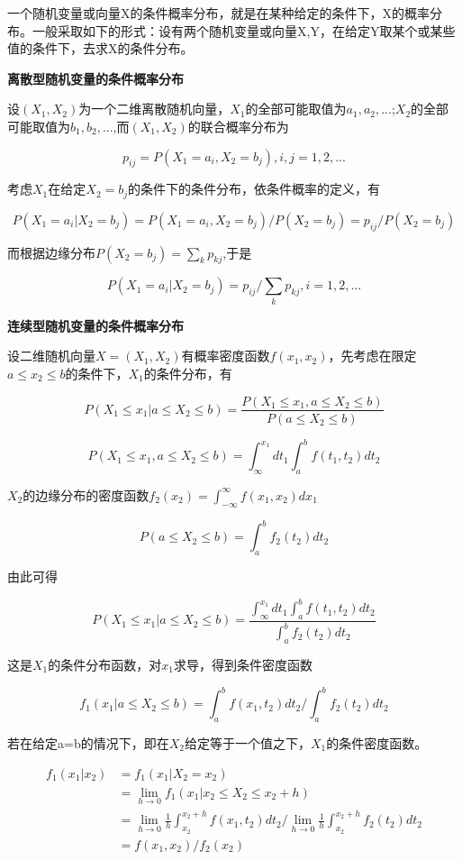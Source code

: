 \documentclass{ctexart}
\begin{document}
	一个随机变量或向量X的条件概率分布，就是在某种给定的条件下，X的概率分布。一般采取如下的形式：设有两个随机变量或向量X,Y，在给定Y取某个或某些值的条件下，去求X的条件分布。
	
	\mbox{}
	
	\textbf{离散型随机变量的条件概率分布}
	
	设\((X_1,X_2)\)为一个二维离散随机向量，\(X_1\)的全部可能取值为\(a_1,a_2,...\);\(X_2\)的全部可能取值为\(b_1,b_2,...\),而\((X_1,X_2)\)的联合概率分布为
	
	\[p_{ij}=P(X_1=a_i,X_2=b_j), i,j=1,2,...\]
	
	考虑\(X_1\)在给定\(X_2=b_j\)的条件下的条件分布，依条件概率的定义，有
	
	\[P(X_1=a_i|X_2=b_j)=P(X_1=a_i, X_2=b_j)/P(X_2=b_j)=p_{ij}/P(X_2=b_j)\]
	
	而根据边缘分布\(P(X_2=b_j)=\sum_{k}p_{kj}\),于是
	
	\[P(X_1=a_i|X_2=b_j)=p_{ij}/\sum_{k}p_{kj}, i=1,2,...\]
	
	\mbox{}
	
	\textbf{连续型随机变量的条件概率分布}
	
	设二维随机向量\(X=(X_1,X_2)\)有概率密度函数\(f(x_1,x_2)\)，先考虑在限定\(a \leq x_2 \leq b\)的条件下，\(X_1\)的条件分布，有
	
	\[P(X_1 \leq x_1 | a \leq X_2 \leq b) = \frac{P(X_1 \leq x_1 , a \leq X_2 \leq b)}{P(a \leq X_2 \leq b)}\]
	
	\[P(X_1 \leq x_1 , a \leq X_2 \leq b)=\int_{\infty}^{x_1} dt_1\int_{a}^{b}f(t_1,t_2)dt_2\]
	
	\(X_2\)的边缘分布的密度函数\(f_2(x_2)=\int_{-\infty}^{\infty}f(x_1, x_2)dx_1\)
	
	\[P(a \leq X_2 \leq b) = \int_{a}^{b}f_2(t_2)dt_2\]
	
	由此可得
	
	\[P(X_1 \leq x_1 | a \leq X_2 \leq b)=\frac{\int_{\infty}^{x_1} dt_1\int_{a}^{b}f(t_1,t_2)dt_2}{\int_{a}^{b}f_2(t_2)dt_2}\]
	
	这是\(X_1\)的条件分布函数，对\(x_1\)求导，得到条件密度函数
	
	\[f_1(x_1| a \leq X_2 \leq b)=\int_{a}^{b}f(x_1, t_2)dt_2/\int_{a}^{b}f_2(t_2)dt_2\]
	
	若在给定a=b的情况下，即在\(X_2\)给定等于一个值之下，\(X_1\)的条件密度函数。
	
	\begin{align*}
	f_1(x_1|x_2) &= f_1(x_1|X_2=x_2) \\
					 & = \lim\limits_{h \rightarrow 0}f_1(x_1|x_2 \leq X_2 \leq x_2+h) \\
					 &= \lim\limits_{h \to 0}\frac{1}{h}\int_{x_2}^{x_2+h}f(x_1, t_2)dt_2/\lim\limits_{h \to 0}\frac{1}{h}\int_{x_2}^{x_2+h}f_2(t_2)dt_2 \\
				 	& = f(x_1, x_2)/f_2(x_2)
	\end{align*}
	
\end{document}
